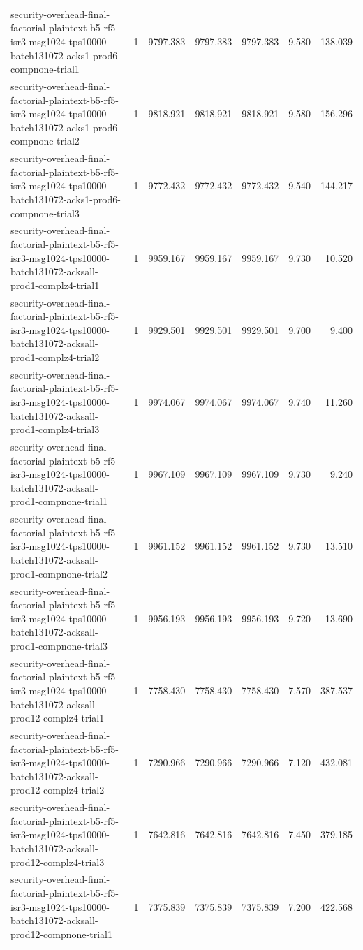 \begin{tabular}{lrrrrrr}
security-overhead-final-factorial-plaintext-b5-rf5-isr3-msg1024-tps10000-batch131072-acks1-prod6-compnone-trial1 & 1 & 9797.383 & 9797.383 & 9797.383 & 9.580 & 138.039 \\
security-overhead-final-factorial-plaintext-b5-rf5-isr3-msg1024-tps10000-batch131072-acks1-prod6-compnone-trial2 & 1 & 9818.921 & 9818.921 & 9818.921 & 9.580 & 156.296 \\
security-overhead-final-factorial-plaintext-b5-rf5-isr3-msg1024-tps10000-batch131072-acks1-prod6-compnone-trial3 & 1 & 9772.432 & 9772.432 & 9772.432 & 9.540 & 144.217 \\
security-overhead-final-factorial-plaintext-b5-rf5-isr3-msg1024-tps10000-batch131072-acksall-prod1-complz4-trial1 & 1 & 9959.167 & 9959.167 & 9959.167 & 9.730 & 10.520 \\
security-overhead-final-factorial-plaintext-b5-rf5-isr3-msg1024-tps10000-batch131072-acksall-prod1-complz4-trial2 & 1 & 9929.501 & 9929.501 & 9929.501 & 9.700 & 9.400 \\
security-overhead-final-factorial-plaintext-b5-rf5-isr3-msg1024-tps10000-batch131072-acksall-prod1-complz4-trial3 & 1 & 9974.067 & 9974.067 & 9974.067 & 9.740 & 11.260 \\
security-overhead-final-factorial-plaintext-b5-rf5-isr3-msg1024-tps10000-batch131072-acksall-prod1-compnone-trial1 & 1 & 9967.109 & 9967.109 & 9967.109 & 9.730 & 9.240 \\
security-overhead-final-factorial-plaintext-b5-rf5-isr3-msg1024-tps10000-batch131072-acksall-prod1-compnone-trial2 & 1 & 9961.152 & 9961.152 & 9961.152 & 9.730 & 13.510 \\
security-overhead-final-factorial-plaintext-b5-rf5-isr3-msg1024-tps10000-batch131072-acksall-prod1-compnone-trial3 & 1 & 9956.193 & 9956.193 & 9956.193 & 9.720 & 13.690 \\
security-overhead-final-factorial-plaintext-b5-rf5-isr3-msg1024-tps10000-batch131072-acksall-prod12-complz4-trial1 & 1 & 7758.430 & 7758.430 & 7758.430 & 7.570 & 387.537 \\
security-overhead-final-factorial-plaintext-b5-rf5-isr3-msg1024-tps10000-batch131072-acksall-prod12-complz4-trial2 & 1 & 7290.966 & 7290.966 & 7290.966 & 7.120 & 432.081 \\
security-overhead-final-factorial-plaintext-b5-rf5-isr3-msg1024-tps10000-batch131072-acksall-prod12-complz4-trial3 & 1 & 7642.816 & 7642.816 & 7642.816 & 7.450 & 379.185 \\
security-overhead-final-factorial-plaintext-b5-rf5-isr3-msg1024-tps10000-batch131072-acksall-prod12-compnone-trial1 & 1 & 7375.839 & 7375.839 & 7375.839 & 7.200 & 422.568 \\

\end{tabular}
